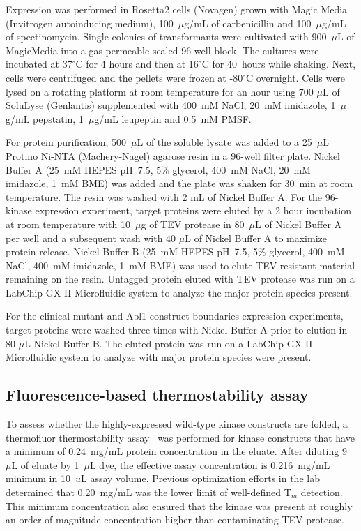 \documentclass[phd,tocprelim]{cornell}
\begin{document}
Expression was performed in Rosetta2 cells (Novagen) grown with Magic Media (Invitrogen autoinducing medium), 100~$\mu$g/mL of carbenicillin and 100~$\mu$g/mL of spectinomycin. 
Single colonies of transformants were cultivated with 900~$\mu$L of MagicMedia into a gas permeable sealed 96-well block. 
The cultures were incubated at 37$^\circ$C for 4 hours and then at 16$^\circ$C for 40~hours while shaking. 
Next, cells were centrifuged and the pellets were frozen at -80$^\circ$C overnight. 
Cells were lysed on a rotating platform at room temperature for an hour using 700 $\mu$L of SoluLyse (Genlantis) supplemented with 400~mM NaCl, 20~mM imidazole, 1~$\mu$g/mL pepstatin, 1~$\mu$g/mL leupeptin and 0.5~mM PMSF. 

For protein purification, 500~$\mu$L of the soluble lysate was added to a 25~$\mu$L Protino Ni-NTA (Machery-Nagel) agarose resin in a 96-well filter plate. 
Nickel Buffer A (25~mM HEPES pH~7.5, 5\% glycerol, 400~mM NaCl, 20~mM imidazole, 1~mM BME) was added and the plate was shaken for 30~min at room temperature. 
The resin was washed with 2 mL of Nickel Buffer A. 
For the 96-kinase expression experiment, target proteins were eluted by a 2 hour incubation at room temperature with 10~$\mu$g of TEV protease in 80~$\mu$L of Nickel Buffer A per well and a subsequent wash with 40 $\mu$L of Nickel Buffer A to maximize protein release. 
Nickel Buffer B (25~mM HEPES pH~7.5, 5\% glycerol, 400~mM NaCl, 400~mM imidazole, 1~mM BME) was used to elute TEV resistant material remaining on the resin.
Untagged protein eluted with TEV protease was run on a LabChip GX II Microfluidic system to analyze the major protein species present. 

For the clinical mutant and Abl1 construct boundaries expression experiments, target proteins were washed three times with Nickel Buffer A prior to elution in 80 $\mu$L Nickel Buffer B. The eluted protein was run on a LabChip GX II Microfluidic system to analyze with major protein species were present. 


\subsection{Fluorescence-based thermostability assay}

To assess whether the highly-expressed wild-type kinase constructs are folded, a thermofluor thermostability assay~\citep{Lo:2004gy,Ericsson:2006dx,Matulis:2005dq} was performed for kinase constructs that have a minimum of 0.24~mg/mL protein concentration in the eluate. After diluting 9~$\mu$L of eluate by 1~$\mu$L dye, the effective assay concentration is 0.216~mg/mL minimum in 10~$u$L assay volume. Previous optimization efforts in the lab determined that 0.20~mg/mL was the lower limit of well-defined T$_m$ detection. This minimum concentration also ensured that the kinase was present at roughly an order of magnitude concentration higher than contaminating TEV protease. 
\end{document}
